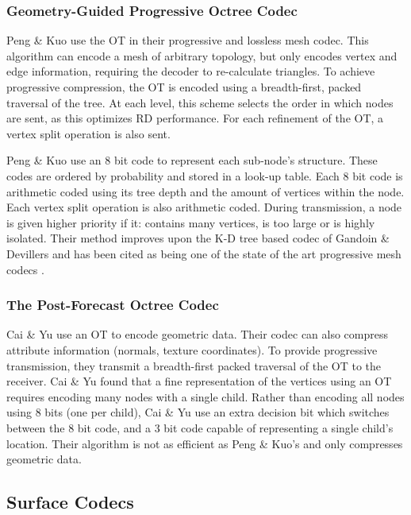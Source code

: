 \subsubsection{Geometry-Guided Progressive Octree Codec}

Peng \& Kuo \cite{Peng05Progressive, Peng05Geometry-Guided} use the OT in their progressive and lossless mesh codec. This algorithm can encode a mesh of arbitrary topology, but only encodes vertex and edge information, requiring the decoder to re-calculate triangles. To achieve progressive compression, the OT is encoded using a breadth-first, packed traversal of the tree. At each level, this scheme selects the order in which nodes are sent, as this optimizes RD performance. For each refinement of the OT, a vertex split operation is also sent.

Peng \& Kuo use an 8 bit code to represent each sub-node's structure. These codes are ordered by probability and stored in a look-up table. Each 8 bit code is arithmetic coded using its tree depth and the amount of vertices within the node. Each vertex split operation is also arithmetic coded. During transmission, a node is given higher priority if it: contains many vertices, is too large or is highly isolated. Their method improves upon the K-D tree based codec of Gandoin \& Devillers \cite{Gandoin02Progressive} and has been cited as being one of the state of the art progressive mesh codecs \cite{Berjon13Objective}.

\subsubsection{The Post-Forecast Octree Codec}

Cai \& Yu \cite{Cai09Post} use an OT to encode geometric data. Their codec can also compress attribute information (normals, texture coordinates). To provide progressive transmission, they transmit a breadth-first packed traversal of the OT to the receiver. Cai \& Yu found that a fine representation of the vertices using an OT requires encoding many nodes with a single child. Rather than encoding all nodes using 8 bits (one per child), Cai \& Yu use an extra decision bit which switches between the 8 bit code, and a 3 bit code capable of representing a single child's location. Their algorithm is not as efficient as Peng \& Kuo's \cite{Peng05Geometry-Guided} and only compresses geometric data.

\subsection{Surface Codecs}

